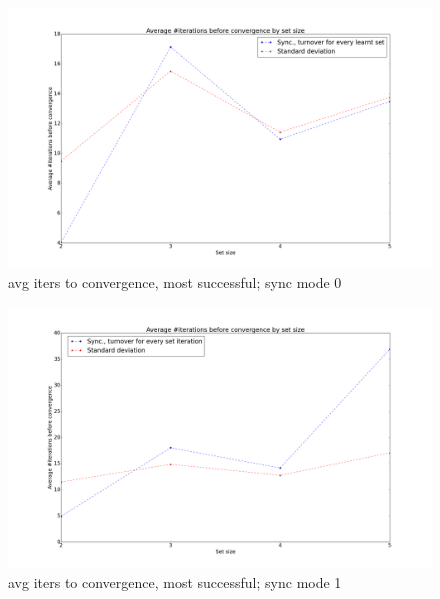 \begin{figure}[h!]
    \centering
    \includegraphics[width=13cm]{fig/avg_convergence_iterations_sync_mode_0.png}
    \caption{avg iters to convergence, most successful; sync mode 0}
    \label{fig:avg_convergence_iterations_sync_mode_0}
\end{figure}

\begin{figure}[h!]
    \centering
    \includegraphics[width=13cm]{fig/avg_convergence_iterations_sync_mode_1.png}
    \caption{avg iters to convergence, most successful; sync mode 1}
    \label{fig:avg_convergence_iterations_sync_mode_1}
\end{figure}

